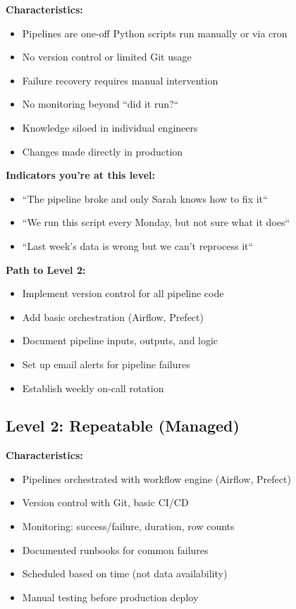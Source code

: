 \textbf{Characteristics:}
\begin{itemize}
    \item Pipelines are one-off Python scripts run manually or via cron
    \item No version control or limited Git usage
    \item Failure recovery requires manual intervention
    \item No monitoring beyond ``did it run?``
    \item Knowledge siloed in individual engineers
    \item Changes made directly in production
\end{itemize}

\textbf{Indicators you're at this level:}
\begin{itemize}
    \item ``The pipeline broke and only Sarah knows how to fix it``
    \item ``We run this script every Monday, but not sure what it does``
    \item ``Last week's data is wrong but we can't reprocess it``
\end{itemize}

\textbf{Path to Level 2:}
\begin{itemize}
    \item Implement version control for all pipeline code
    \item Add basic orchestration (Airflow, Prefect)
    \item Document pipeline inputs, outputs, and logic
    \item Set up email alerts for pipeline failures
    \item Establish weekly on-call rotation
\end{itemize}

\subsection{Level 2: Repeatable (Managed)}

\textbf{Characteristics:}
\begin{itemize}
    \item Pipelines orchestrated with workflow engine (Airflow, Prefect)
    \item Version control with Git, basic CI/CD
    \item Monitoring: success/failure, duration, row counts
    \item Documented runbooks for common failures
    \item Scheduled based on time (not data availability)
    \item Manual testing before production deploy
\end{itemize}

